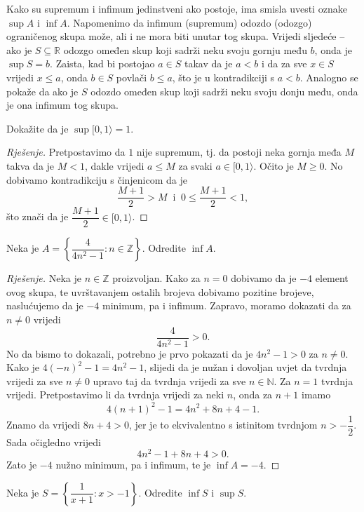 Kako su supremum i infimum jedinstveni ako postoje, ima smisla uvesti oznake $\sup{A}$ i $\inf{A}$.
Napomenimo da infimum (supremum) odozdo (odozgo) ograničenog skupa može, ali i ne mora biti unutar tog skupa. Vrijedi sljedeće -- ako je $S\subseteq \mathbb{R}$ odozgo omeđen skup koji sadrži neku svoju gornju među $b$, onda je $\sup{S}=b$. Zaista, kad bi postojao $a\in S$ takav da je $a<b$ i da za sve $x\in S$ vrijedi $x\leq a$, onda $b\in S$ povlači $b\leq a$, što je u kontradikciji s $a<b$. Analogno se pokaže da ako je $S$ odozdo omeđen skup koji sadrži neku svoju donju među, onda je ona infimum tog skupa.
\begin{exercise}
Dokažite da je $\sup{[0, 1\rangle}=1$.
\end{exercise}
\begin{proof}[Rješenje]
Pretpostavimo da $1$ nije supremum, tj. da postoji neka gornja međa $M$ takva da je $M<1$, dakle vrijedi $a\leq M$ za svaki $a\in [0, 1\rangle$. Očito je $M\geq 0$. No dobivamo kontradikciju s činjenicom da je $$\dfrac{M+1}{2}>M\;\;\text{i}\;\;0\leq \dfrac{M+1}{2}<1,$$ što znači da je $\dfrac{M+1}{2}\in [0, 1\rangle$.
\end{proof}
\begin{exercise}
Neka je $A=\left\{\dfrac{4}{4n^2-1} : n\in \mathbb{Z}\right\}$. Odredite $\inf{A}$.
\end{exercise}
\begin{proof}[Rješenje]
Neka je $n\in \mathbb{Z}$ proizvoljan. Kako za $n=0$ dobivamo da je $-4$ element ovog skupa, te uvrštavanjem ostalih brojeva dobivamo pozitine brojeve, naslućujemo da je $-4$ minimum, pa i infimum. Zapravo, moramo dokazati da za $n\neq 0$ vrijedi $$\dfrac{4}{4n^2-1}>0.$$ No da bismo to dokazali, potrebno je prvo pokazati da je $4n^2-1>0$ za $n\neq 0$. Kako je $4(-n)^2-1=4n^2-1$, slijedi da je nužan i dovoljan uvjet da tvrdnja vrijedi za sve $n\neq 0$ upravo taj da tvrdnja vrijedi za sve $n\in \mathbb{N}$. Za $n=1$ tvrdnja vrijedi. Pretpostavimo li da tvrdnja vrijedi za neki $n$, onda za $n+1$ imamo $$4(n+1)^2-1=4n^2+8n+4-1.$$ Znamo da vrijedi $8n+4>0$, jer je to ekvivalentno s istinitom tvrdnjom $n>-\dfrac{1}{2}$. Sada očigledno vrijedi $$4n^2-1+8n+4>0.$$ Zato je $-4$ nužno minimum, pa i infimum, te je $\inf{A}=-4$.
\end{proof}
\begin{exercise}
\label{13}
Neka je $S=\left\{\dfrac{1}{x+1} : x>-1\right\}$. Odredite $\inf{S}$ i $\sup{S}$.
\end{exercise}
